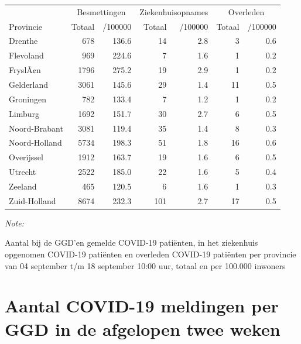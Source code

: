 \documentclass[
  english,
  man,floatsintext]{apa6}
\begin{document}
\begin{table}
\centering
\begin{threeparttable}
\begin{tabular}{lrrrrrr}
\toprule
\multicolumn{1}{c}{ } & \multicolumn{2}{c}{Besmettingen} & \multicolumn{2}{c}{Ziekenhuisopnames} & \multicolumn{2}{c}{Overleden} \\
\cmidrule(l{3pt}r{3pt}){2-3} \cmidrule(l{3pt}r{3pt}){4-5} \cmidrule(l{3pt}r{3pt}){6-7}
Provincie & Totaal & /100000 & Totaal & /100000 & Totaal & /100000\\
\midrule
Drenthe & 678 & 136.6 & 14 & 2.8 & 3 & 0.6\\
Flevoland & 969 & 224.6 & 7 & 1.6 & 1 & 0.2\\
FryslÃ¢n & 1796 & 275.2 & 19 & 2.9 & 1 & 0.2\\
Gelderland & 3061 & 145.6 & 29 & 1.4 & 11 & 0.5\\
Groningen & 782 & 133.4 & 7 & 1.2 & 1 & 0.2\\
Limburg & 1692 & 151.7 & 30 & 2.7 & 6 & 0.5\\
Noord-Brabant & 3081 & 119.4 & 35 & 1.4 & 8 & 0.3\\
Noord-Holland & 5734 & 198.3 & 51 & 1.8 & 16 & 0.6\\
Overijssel & 1912 & 163.7 & 19 & 1.6 & 6 & 0.5\\
Utrecht & 2522 & 185.0 & 22 & 1.6 & 5 & 0.4\\
Zeeland & 465 & 120.5 & 6 & 1.6 & 1 & 0.3\\
Zuid-Holland & 8674 & 232.3 & 101 & 2.7 & 17 & 0.5\\
\bottomrule
\end{tabular}
\begin{tablenotes}
\item \textit{Note: } 
\item Aantal bij de GGD’en gemelde COVID-19 patiënten, in het ziekenhuis opgenomen COVID-19 patiënten en overleden COVID-19 patiënten per provincie van 04 september t/m 18 september 10:00 uur, totaal en per 100.000 inwoners
\end{tablenotes}
\end{threeparttable}
\end{table}

\newpage

\hypertarget{aantal-covid-19-meldingen-per-ggd-in-de-afgelopen-twee-weken}{%
\section{Aantal COVID-19 meldingen per GGD in de afgelopen twee weken}\label{aantal-covid-19-meldingen-per-ggd-in-de-afgelopen-twee-weken}}
\end{document}
